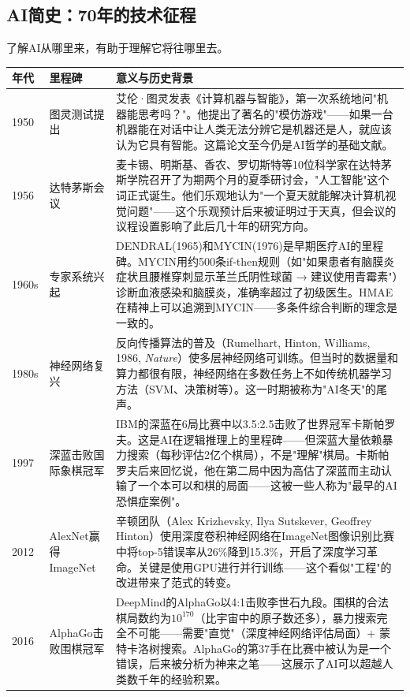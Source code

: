 \documentclass[11pt,a4paper]{ctexart}
\begin{document}
\subsection{AI简史：70年的技术征程}

了解AI从哪里来，有助于理解它将往哪里去。

\begin{table}[H]
\centering
\small
\begin{tabular}{p{0.9cm}p{2.8cm}p{10.8cm}}
\toprule
\textbf{年代} & \textbf{里程碑} & \textbf{意义与历史背景} \\
\midrule
1950 & 图灵测试提出 & 艾伦·图灵发表《计算机器与智能》，第一次系统地问"机器能思考吗？"。他提出了著名的"模仿游戏"——如果一台机器能在对话中让人类无法分辨它是机器还是人，就应该认为它具有智能。这篇论文至今仍是AI哲学的基础文献。 \\
1956 & 达特茅斯会议 & 麦卡锡、明斯基、香农、罗切斯特等10位科学家在达特茅斯学院召开了为期两个月的夏季研讨会，"人工智能"这个词正式诞生。他们乐观地认为"一个夏天就能解决计算机视觉问题"——这个乐观预计后来被证明过于天真，但会议的议程设置影响了此后几十年的研究方向。 \\
1960s & 专家系统兴起 & DENDRAL(1965)和MYCIN(1976)是早期医疗AI的里程碑。MYCIN用约500条if-then规则（如"如果患者有脑膜炎症状且腰椎穿刺显示革兰氏阴性球菌 → 建议使用青霉素"）诊断血液感染和脑膜炎，准确率超过了初级医生。HMAE在精神上可以追溯到MYCIN——多条件综合判断的理念是一致的。 \\
1980s & 神经网络复兴 & 反向传播算法的普及（Rumelhart, Hinton, Williams, 1986, \textit{Nature}）使多层神经网络可训练。但当时的数据量和算力都很有限，神经网络在多数任务上不如传统机器学习方法（SVM、决策树等）。这一时期被称为"AI冬天"的尾声。 \\
1997 & 深蓝击败国际象棋冠军 & IBM的深蓝在6局比赛中以3.5:2.5击败了世界冠军卡斯帕罗夫。这是AI在逻辑推理上的里程碑——但深蓝大量依赖暴力搜索（每秒评估2亿个棋局），不是"理解"棋局。卡斯帕罗夫后来回忆说，他在第二局中因为高估了深蓝而主动认输了一个本可以和棋的局面——这被一些人称为"最早的AI恐惧症案例"。 \\
2012 & AlexNet赢得ImageNet & 辛顿团队（Alex Krizhevsky, Ilya Sutskever, Geoffrey Hinton）使用深度卷积神经网络在ImageNet图像识别比赛中将top-5错误率从26\%降到15.3\%，开启了深度学习革命。关键是使用GPU进行并行训练——这个看似"工程"的改进带来了范式的转变。 \\
2016 & AlphaGo击败围棋冠军 & DeepMind的AlphaGo以4:1击败李世石九段。围棋的合法棋局数约为$10^{170}$（比宇宙中的原子数还多），暴力搜索完全不可能——需要"直觉"（深度神经网络评估局面）+ 蒙特卡洛树搜索。AlphaGo的第37手在比赛中被认为是一个错误，后来被分析为神来之笔——这展示了AI可以超越人类数千年的经验积累。 \\

\end{tabular}
\end{table}
\end{document}
